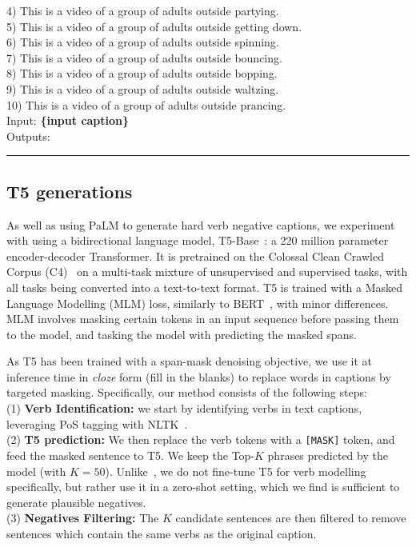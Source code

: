 { 4) This is a video of a group of adults outside partying. \\
 5) This is a video of a group of adults outside getting down. \\
 6) This is a video of a group of adults outside spinning. \\
 7) This is a video of a group of adults outside bouncing. \\
 8) This is a video of a group of adults outside bopping.\\
 9) This is a video of a group of adults outside waltzing. \\
 10) This is a video of a group of adults outside prancing.\\
Input: \textbf{\{input caption\}}\\
Outputs: \\}
\noindent\rule{8.5cm}{0.4pt}

\subsection{T5 generations}\label{subsec:app:t5}

As well as using PaLM to generate hard verb negative captions, we experiment with using  a bidirectional language model, T5-Base~\cite{2020t5}: a 220 million parameter encoder-decoder Transformer. 
It is pretrained on the Colossal Clean Crawled Corpus (C4)~\cite{palm} on a multi-task mixture of unsupervised and supervised tasks, with all tasks being converted into a text-to-text format. 
T5 is trained with a Masked Language Modelling (MLM) loss, similarly to BERT~\cite{devlin-etal-2019-bert}, with minor differences. 
MLM involves masking certain tokens in an input sequence before passing them to the model, and tasking the model with predicting the masked spans. 

As T5 has been trained with a span-mask denoising objective, we use it at inference time in \textit{cloze} form (fill in the blanks) to replace words in captions by targeted masking. 
Specifically, our method consists of the following steps: \\ 
(1) \textbf{Verb Identification:} we start by identifying verbs in text captions, leveraging PoS tagging with NLTK~\cite{bird2009natural}. \\
(2) \textbf{T5 prediction:}
We then replace the verb tokens with a \texttt{[MASK]} token, and feed the masked sentence to T5. We keep the Top-$K$ phrases predicted by the model (with $K = 50$). 
Unlike~\cite{park-etal-2022-exposing}, we do not fine-tune T5 for verb modelling specifically, but rather use it in a zero-shot setting, which we find is sufficient to generate plausible negatives. \\
(3) \textbf{Negatives Filtering:}
The $K$ candidate sentences are then filtered to remove sentences which contain the same verbs as the original caption.

